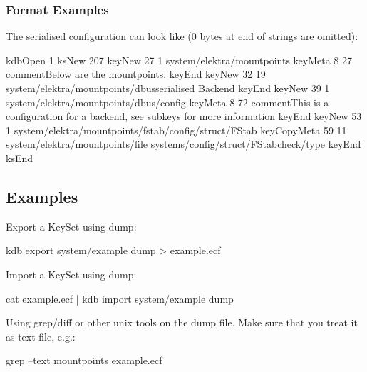 \subsubsection*{Format Examples}

The serialised configuration can look like (0 bytes at end of strings are omitted)\+: \begin{DoxyVerb}    kdbOpen 1               
    ksNew 207               
    keyNew 27 1             
    system/elektra/mountpoints               
    keyMeta 8 27            
    commentBelow are the mountpoints.                
    keyEnd          
    keyNew 32 19             
    system/elektra/mountpoints/dbusserialised Backend               
    keyEnd keyNew 39 1              
    system/elektra/mountpoints/dbus/config          
    keyMeta 8 72            
    commentThis is a configuration for a backend, see subkeys for more information          
    keyEnd          
    keyNew 53 1             
    system/elektra/mountpoints/fstab/config/struct/FStab            
    keyCopyMeta 59 11               
    system/elektra/mountpoints/file                 
    systems/config/struct/FStabcheck/type           
    keyEnd          
    ksEnd           
\end{DoxyVerb}


\subsection*{Examples}

Export a Key\+Set using {\ttfamily dump}\+: \begin{DoxyVerb}    kdb export system/example dump > example.ecf
\end{DoxyVerb}


Import a Key\+Set using {\ttfamily dump}\+: \begin{DoxyVerb}    cat example.ecf | kdb import system/example dump
\end{DoxyVerb}


Using grep/diff or other unix tools on the dump file. Make sure that you treat it as text file, e.\+g.\+: \begin{DoxyVerb}    grep --text mountpoints example.ecf\end{DoxyVerb}
 